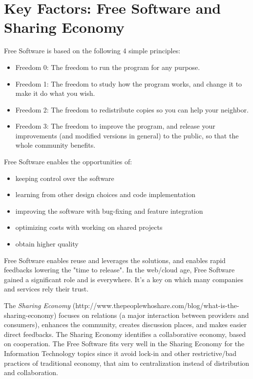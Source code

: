 \section{Key Factors: Free Software and Sharing
Economy}\label{key-factors-free-software-and-sharing-economy}

Free Software is based on the following 4 simple principles:
\begin{itemize}
\item Freedom 0: The freedom to run the program for any purpose.
\item Freedom 1: The freedom to study how the program works, and change it to make it do what you wish.
\item Freedom 2: The freedom to redistribute copies so you can help your neighbor.
\item Freedom 3: The freedom to improve the program, and release your improvements (and modified versions in general) to the public, so that the whole community benefits.
\end{itemize}

Free Software enables the opportunities of:
\begin{itemize}
\item keeping control over the software
\item learning from other design choices and code implementation
\item improving the software with bug-fixing and feature integration
\item optimizing costs with working on shared projects
\item obtain higher quality
\end{itemize}

Free Software enables reuse and leverages the solutions, and enables rapid feedbacks lowering the "time to release". In the web/cloud age, Free Software gained a significant role and is everywhere. It's a key on which many companies and services rely their trust.

The \textit{Sharing Economy} (http://www.thepeoplewhoshare.com/blog/what-is-the-sharing-economy) focuses on relations (a major interaction between providers and consumers), enhances the community, creates discussion places, and makes easier direct feedbacks. The Sharing Economy identifies a collaborative economy, based on cooperation. The Free Software fits very well in the Sharing Economy for the Information
Technology topics since it avoid lock-in and other restrictive/bad practices of traditional economy, that aim to centralization instead of distribution and collaboration.

